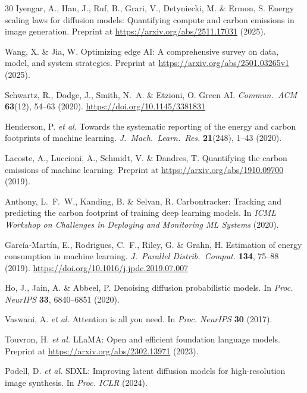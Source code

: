 \documentclass[11pt]{article}
\begin{document}
\begin{thebibliography}{30}
Iyengar, A., Han, J., Ruf, B., Grari, V., Detyniecki, M. \& Ermon, S.
Energy scaling laws for diffusion models: Quantifying compute and carbon emissions in image generation.
Preprint at \url{https://arxiv.org/abs/2511.17031} (2025).

Wang, X. \& Jia, W.
Optimizing edge AI: A comprehensive survey on data, model, and system strategies.
Preprint at \url{https://arxiv.org/abs/2501.03265v1} (2025).

Schwartz, R., Dodge, J., Smith, N.~A. \& Etzioni, O.
Green AI.
\textit{Commun.~ACM} \textbf{63}(12), 54--63 (2020).
\url{https://doi.org/10.1145/3381831}

Henderson, P. \textit{et al.}
Towards the systematic reporting of the energy and carbon footprints of machine learning.
\textit{J.~Mach.~Learn.~Res.} \textbf{21}(248), 1--43 (2020).

Lacoste, A., Luccioni, A., Schmidt, V. \& Dandres, T.
Quantifying the carbon emissions of machine learning.
Preprint at \url{https://arxiv.org/abs/1910.09700} (2019).

Anthony, L.~F.~W., Kanding, B. \& Selvan, R.
Carbontracker: Tracking and predicting the carbon footprint of training deep learning models.
In \textit{ICML Workshop on Challenges in Deploying and Monitoring ML Systems} (2020).

Garc\'{i}a-Mart\'{i}n, E., Rodrigues, C.~F., Riley, G. \& Grahn, H.
Estimation of energy consumption in machine learning.
\textit{J.~Parallel Distrib.~Comput.} \textbf{134}, 75--88 (2019).
\url{https://doi.org/10.1016/j.jpdc.2019.07.007}

Ho, J., Jain, A. \& Abbeel, P.
Denoising diffusion probabilistic models.
In \textit{Proc. NeurIPS} \textbf{33}, 6840--6851 (2020).

Vaswani, A. \textit{et al.}
Attention is all you need.
In \textit{Proc. NeurIPS} \textbf{30} (2017).

Touvron, H. \textit{et al.}
LLaMA: Open and efficient foundation language models.
Preprint at \url{https://arxiv.org/abs/2302.13971} (2023).

Podell, D. \textit{et al.}
SDXL: Improving latent diffusion models for high-resolution image synthesis.
In \textit{Proc. ICLR} (2024).

\end{thebibliography}
\end{document}
